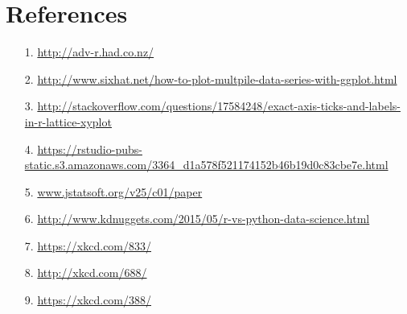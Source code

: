 
\section{References}

\begin{frame}
  \begin{itemize}
    \item[1.] \url{http://adv-r.had.co.nz/}
    \item[2.] \url{http://www.sixhat.net/how-to-plot-multpile-data-series-with-ggplot.html}
    \item[3.] \url{http://stackoverflow.com/questions/17584248/exact-axis-ticks-and-labels-in-r-lattice-xyplot}
    \item[4.] \url{https://rstudio-pubs-static.s3.amazonaws.com/3364_d1a578f521174152b46b19d0c83cbe7e.html}
    \item[5.] \url{www.jstatsoft.org/v25/c01/paper}
    \item[6.] \url{http://www.kdnuggets.com/2015/05/r-vs-python-data-science.html}
    \item[7.] \url{https://xkcd.com/833/}
    \item[8.] \url{http://xkcd.com/688/}
    \item[9.] \url{https://xkcd.com/388/}
  \end{itemize}
\end{frame}



